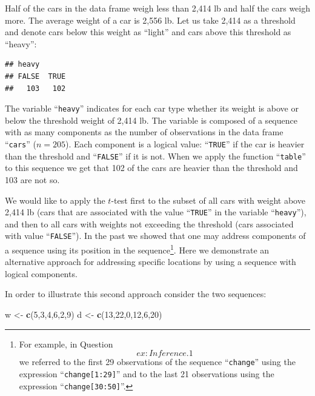 \documentclass[
]{krantz}
\makeatletter
\newenvironment{Shaded}{\begin{snugshade}}{\end{snugshade}}
\newcommand{\DecValTok}[1]{\textcolor[rgb]{0.00,0.00,0.81}{#1}}
\newcommand{\KeywordTok}[1]{\textcolor[rgb]{0.13,0.29,0.53}{\textbf{#1}}}
\newcommand{\NormalTok}[1]{#1}
\newcommand{\OperatorTok}[1]{\textcolor[rgb]{0.81,0.36,0.00}{\textbf{#1}}}
\newcommand{\StringTok}[1]{\textcolor[rgb]{0.31,0.60,0.02}{#1}}
\newenvironment{kframe}{%
\medskip{}
\setlength{\fboxsep}{.8em}
 \def\at@end@of@kframe{}%
 \ifinner\ifhmode%
  \def\at@end@of@kframe{\end{minipage}}%
  \begin{minipage}{\columnwidth}%
 \fi\fi%
 \def\FrameCommand##1{\hskip\@totalleftmargin \hskip-\fboxsep
 \colorbox{shadecolor}{##1}\hskip-\fboxsep
     \hskip-\linewidth \hskip-\@totalleftmargin \hskip\columnwidth}%
 \MakeFramed {\advance\hsize-\width
   \@totalleftmargin\z@ \linewidth\hsize
   \@setminipage}}%
 {\par\unskip\endMakeFramed%
 \at@end@of@kframe}
\renewenvironment{Shaded}{\begin{kframe}}{\end{kframe}}
\theoremstyle{definition}
\theoremstyle{definition}
\theoremstyle{definition}
\theoremstyle{remark}
\makeatother
\begin{document}
Half of the cars in the data frame weigh less than 2,414 lb and half the
cars weigh more. The average weight of a car is 2,556 lb. Let us take
2,414 as a threshold and denote cars below this weight as ``light'' and
cars above this threshold as ``heavy'':

\begin{Shaded}
\end{Shaded}

\begin{verbatim}
## heavy
## FALSE  TRUE 
##   103   102
\end{verbatim}

The variable ``\texttt{heavy}'' indicates for each car type whether its weight is
above or below the threshold weight of 2,414 lb. The variable is
composed of a sequence with as many components as the number of
observations in the data frame ``\texttt{cars}'' (\(n = 205\)). Each component is a
logical value: ``\texttt{TRUE}'' if the car is heavier than the threshold and
``\texttt{FALSE}'' if it is not. When we apply the function ``\texttt{table}'' to this
sequence we get that 102 of the cars are heavier than the threshold and
103 are not so.

We would like to apply the \(t\)-test first to the subset of all cars with
weight above 2,414 lb (cars that are associated with the value ``\texttt{TRUE}''
in the variable ``\texttt{heavy}''), and then to all cars with weights not
exceeding the threshold (cars associated with value ``\texttt{FALSE}''). In the
past we showed that one may address components of a sequence using its
position in the sequence\footnote{For example, in Question~\[ex:Inference.1\] we referred to the
  first 29 observations of the sequence ``\texttt{change}'' using the
  expression ``\texttt{change{[}1:29{]}}'' and to the last 21 observations using
  the expression ``\texttt{change{[}30:50{]}}''.}. Here we demonstrate an alternative
approach for addressing specific locations by using a sequence with
logical components.

In order to illustrate this second approach consider the two sequences:

\begin{Shaded}
\begin{Highlighting}[]
\NormalTok{w <-}\StringTok{ }\KeywordTok{c}\NormalTok{(}\DecValTok{5}\NormalTok{,}\DecValTok{3}\NormalTok{,}\DecValTok{4}\NormalTok{,}\DecValTok{6}\NormalTok{,}\DecValTok{2}\NormalTok{,}\DecValTok{9}\NormalTok{)}
\NormalTok{d <-}\StringTok{ }\KeywordTok{c}\NormalTok{(}\DecValTok{13}\NormalTok{,}\DecValTok{22}\NormalTok{,}\DecValTok{0}\NormalTok{,}\DecValTok{12}\NormalTok{,}\DecValTok{6}\NormalTok{,}\DecValTok{20}\NormalTok{)}
\end{Highlighting}
\end{Shaded}
\end{document}
